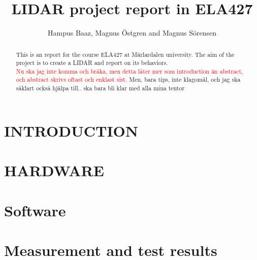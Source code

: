 

\title{\LARGE \bf
LIDAR project report in ELA427}
\author{Hampus Baaz, Magnus \"{O}stgren and Magnus S\"{o}rensen }


\maketitle
\thispagestyle{empty}
\pagestyle{empty}

\begin{abstract}
This is an report for the course ELA427 at M\"{a}rlardalen university. The aim of the project is to create a LIDAR and report on its behaviors.\\
\textcolor{red}{Nu ska jag inte komma och bråka, men detta låter mer som introduction än abstract, och abstract skrivs oftast och enklast sist.} Men, bara tips, inte klagomål, och jag ska såklart också hjälpa till.. ska bara bli klar med alla mina tentor 
\end{abstract}


\section{INTRODUCTION}




\section{HARDWARE}


\section{Software}

\section{Measurement and test results}
%
